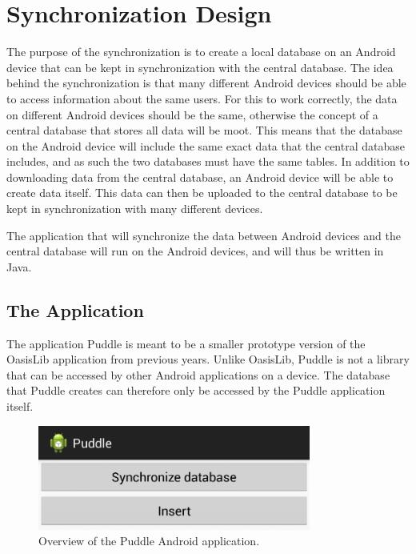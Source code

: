 \section{Synchronization Design}
The purpose of the synchronization is to create a local database on an Android device that can be kept in synchronization with the central database. The idea behind the synchronization is that many different Android devices should be able to access information about the same users. For this to work correctly, the data on different Android devices should be the same, otherwise the concept of a central database that stores all data will be moot. This means that the database on the Android device will include the same exact data that the central database includes, and as such the two databases must have the same tables. In addition to downloading data from the central database, an Android device will be able to create data itself. This data can then be uploaded to the central database to be kept in synchronization with many different devices.

The application that will synchronize the data between Android devices and the central database will run on the Android devices, and will thus be written in Java.

\subsection{The Application}
The application Puddle is meant to be a smaller prototype version of the OasisLib application from previous years. Unlike OasisLib, Puddle is not a library that can be accessed by other Android applications on a device. The database that Puddle creates can therefore only be accessed by the Puddle application itself.

\begin{figure}[hptb]
    \begin{center}
    \includegraphics[width=0.8\textwidth]{img/puddle-app.png}
    \caption{Overview of the Puddle Android application.}
    \label{fig:puddle_app}
    \end{center}
\end{figure}

